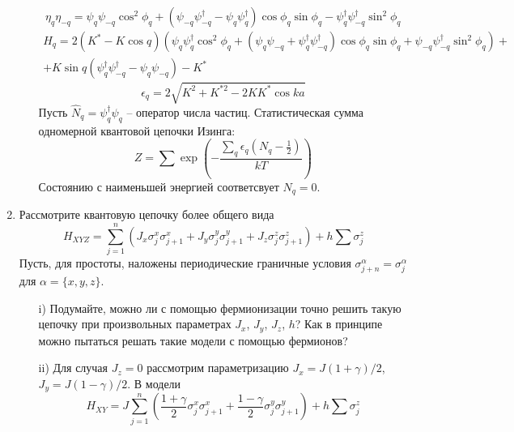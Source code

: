 \documentclass[12pt]{article}
\theoremstyle{definition}
\begin{document}
\begin{enumerate}
\begin{itemize}
\begin{equation}
        \end{equation}
        \begin{equation}
            \eta_q\eta_{-q}=\psi_q\psi_{-q}\cos^2\phi_q+(\psi_{-q}\psi^\dagger_{-q}-\psi_q\psi^\dagger_q)\cos\phi_q\sin\phi_q-\psi^\dagger_q\psi^\dagger_{-q}\sin^2\phi_q
        \end{equation}
        \begin{multline}
            H_q=2(K^*-K\cos q)(\psi_q\psi^\dagger_q\cos^2\phi_q+(\psi_q\psi_{-q}+\psi^\dagger_q\psi^\dagger_{-q})\cos\phi_q\sin\phi_q+\psi_{-q}\psi^\dagger_{-q}\sin^2\phi_q)+\\+K\sin q(\psi^\dagger_q\psi^\dagger_{-q}-\psi_q\psi_{-q})-K^*
        \end{multline}
        \begin{equation}
            \epsilon_q=2\sqrt{K^2+K^{*2}-2KK^*\cos ka}
        \end{equation}
        Пусть $\hat{N}_q=\psi^\dagger_q\psi_q$ -- оператор числа частиц. Статистическая сумма одномерной квантовой цепочки Изинга:
        \begin{equation}
            Z=\sum\exp\left(-\frac{\sum\limits_q\epsilon_q(N_q-\frac{1}{2})}{kT}\right)
        \end{equation}
        Состоянию с наименьшей энергией соответсвует $N_q=0$.
    \end{itemize}
    \item Рассмотрите квантовую цепочку более общего вида
    \begin{equation}
        H_{XYZ}=\sum\limits_{j=1}^n(J_x\sigma_j^x\sigma_{j+1}^x+J_y\sigma^y_j\sigma^y_{j+1}+J_z\sigma^z_j\sigma^z_{j+1})+h\sum\sigma_j^z
    \end{equation}
    Пусть, для простоты, наложены периодические граничные условия $\sigma^\alpha_{j+n}=\sigma^\alpha_j$ для $\alpha=\{x,y,z\}$.
    \begin{itemize}
        \item[i)] Подумайте, можно ли с помощью фермионизации точно решить такую цепочку при произвольных параметрах $J_x$, $J_y$, $J_z$, $h$? Как в принципе можно пытаться решать такие модели с помощью фермионов?
        \item[ii)] Для случая $J_z=0$ рассмотрим параметризацию $J_x=J(1+\gamma)/2$, $J_y=J(1-\gamma)/2$. В модели
        \begin{equation}
            H_{XY}=J\sum\limits_{j=1}^n\left(\frac{1+\gamma}{2}\sigma_j^x\sigma^x_{j+1}+\frac{1-\gamma}{2}\sigma_j^y\sigma_{j+1}^y\right)+h\sum\sigma^z_j
        \end{equation}

\end{itemize}
\end{enumerate}
\end{document}
